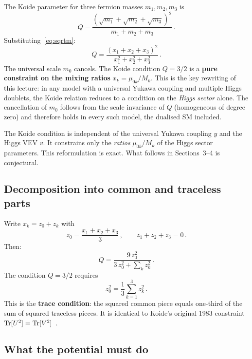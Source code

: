 \documentclass[11pt,a4paper]{article}
\begin{document}
The Koide parameter for three fermion masses $m_1, m_2, m_3$ is
\begin{equation}
  Q = \frac{(\sqrt{m_1}+\sqrt{m_2}+\sqrt{m_3})^2}
  {m_1+m_2+m_3}\,.
  \label{eq:Q}
\end{equation}
Substituting~\eqref{eq:sqrtm}:
\begin{equation}
  \boxed{Q = \frac{(x_1+x_2+x_3)^2}{x_1^2+x_2^2+x_3^2}\,.}
  \label{eq:Qx}
\end{equation}
The universal scale $m_0$ cancels.  The Koide condition
$Q = 3/2$ is a \textbf{pure constraint on the mixing ratios}
$x_k = \mu_{0k}/M_k$.  This is the key rewriting of this
lecture: in any model with a universal Yukawa coupling and
multiple Higgs doublets, the Koide relation reduces to a
condition on the \emph{Higgs sector} alone.  The cancellation
of $m_0$ follows from the scale invariance of $Q$ (homogeneous of
degree zero) and therefore holds in every such model, the dualised SM
included.

\begin{warningbox}
The Koide condition is independent of the universal Yukawa
coupling $y$ and the Higgs VEV $v$.  It constrains only the
\emph{ratios} $\mu_{0k}/M_k$ of the Higgs sector parameters.
This reformulation is exact.  What follows in Sections~3--4
is conjectural.
\end{warningbox}

\subsection{Decomposition into common and traceless parts}

Write $x_k = z_0 + z_k$ with
\begin{equation}
  z_0 = \frac{x_1+x_2+x_3}{3}\,,\qquad
  z_1+z_2+z_3 = 0\,.
  \label{eq:z0zk}
\end{equation}
Then:
\begin{equation}
  Q = \frac{9\,z_0^2}{3\,z_0^2 + \sum_k z_k^2}\,.
  \label{eq:Qz}
\end{equation}
The condition $Q = 3/2$ requires
\begin{equation}
  z_0^2 = \frac{1}{3}\sum_{k=1}^3 z_k^2\,.
  \label{eq:koide-cond}
\end{equation}
This is the \textbf{trace condition}: the squared common piece
equals one-third of the sum of squared traceless pieces.
It is identical to Koide's original 1983 constraint
$\mathrm{Tr}[U^2] = \mathrm{Tr}[V^2]$~\cite{Koide1983}.

\subsection{What the potential must do}
\end{document}
